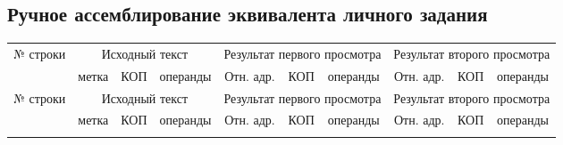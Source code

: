 \documentclass[12pt, a4paper]{article}
\begin{document}
\begin{landscape}
\subsection*{Ручное ассемблирование эквивалента личного задания}
\renewcommand{\arraystretch}{1.3}
\small
\begin{longtable}{|c|l|l|l|c|l|l|c|l|l|}
\hline
\multirow{2}{*}{№ строки} & \multicolumn{3}{c|}{Исходный текст} & \multicolumn{3}{c|}{Результат первого просмотра} & \multicolumn{3}{c|}{Результат второго просмотра} \\
\cline{2-10}
& метка & КОП & операнды & Отн. адр. & КОП & операнды & Отн. адр. & КОП & операнды \\
\hline
\endfirsthead
\hline
\multirow{2}{*}{№ строки} & \multicolumn{3}{c|}{Исходный текст} & \multicolumn{3}{c|}{Результат первого просмотра} & \multicolumn{3}{c|}{Результат второго просмотра} \\
\cline{2-10}
& метка & КОП & операнды & Отн. адр. & КОП & операнды & Отн. адр. & КОП & операнды \\
\hline
\endhead
\hline
\endfoot
\hline
\endlastfoot


\end{longtable}
\end{landscape}
\end{document}
